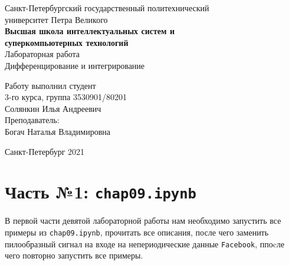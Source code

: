 \documentclass[a4paper]{article}
\begin{document}
    \begin{center}
        \begin{center}
        \hfill \break
        \normalsize{Санкт-Петербургский государственный политехнический}\\
        \normalsize{университет Петра Великого}\\
        \hfill \break
        \normalsize{\textbf{Высшая школа интеллектуальных систем и}}\\ 
        \normalsize{\textbf{суперкомпьютерных технологий}}\\ 
        \hfill \break
        \hfill \break
        \hfill \break
        \normalsize{Лабораторная работа}\\
        \hfill \break
        \hfill \break
        \normalsize{\LARGE Дифференцирование и интегрирование}\\
        \end{center}
        \hfill \break
        \hfill \break
        \hfill \break
        \hfill \break
        \hfill \break
        \hfill \break
        \hfill \break
        \hfill \break
        \hfill \break
        \hfill \break
        \begin{flushright}
            \normalsize{Работу выполнил студент}\\
            \normalsize{3-го курса, группа 3530901/80201}\\
            \normalsize{Солянкин Илья Андреевич}\\
            \hfill \break
            \normalsize{Преподаватель:}\\
            \normalsize{Богач Наталья Владимировна}\\
        \end{flushright}
        \hfill \break
        \hfill \break
        \hfill \break
        \hfill \break
        \begin{center} Санкт-Петербург 2021 \end{center}
        \thispagestyle{empty}
    \end{center}
    
    \newpage
        \tableofcontents
    
    \newpage
         \listoffigures
    
    \newpage
         \lstlistoflistings   
     
    \newpage
        \section{Часть №1: \texttt{chap09.ipynb}}
            В первой части девятой лабораторной работы нам необходимо запустить все примеры из \texttt{chap09.ipynb}, прочитать все описания, после чего заменить пилообразный сигнал на входе на непериодические данные \texttt{Facebook}, ппоcле чего повторно запустить все примеры.
            
\end{document}
